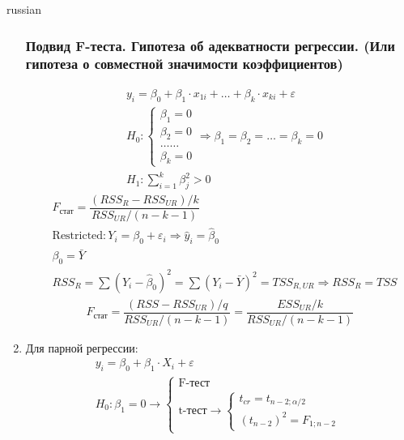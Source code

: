 \documentclass{article}
\begin{document}
\begin{otherlanguage*}{russian}
\begin{enumerate}
\subsubsection*{Подвид F-теста. Гипотеза об адекватности регрессии. (Или гипотеза о совместной значимости коэффициентов)  }
\begin{align*}
&y_i = \beta_0 + \beta_1 \cdot x_{1i} + \ldots + \beta_k \cdot x_{ki} + \varepsilon \\ 
&H_0 : \begin{cases}
\beta_1 = 0 \\
\beta_2 = 0 \\
\ldots \ldots \\ 
\beta_k = 0 
\end{cases} \Rightarrow \beta_1 = \beta_2 = \ldots = \beta_k = 0 \\
&H_1: \sum_{i=1}^k \beta_j^2 > 0 
\end{align*}
\begin{align*}
&F_{\text{стат}}  = \dfrac{(RSS_R - RSS_{UR}) / k}{RSS_{UR} / (n - k - 1) } \\
&\text{Restricted}: Y_i = \beta_0 + \varepsilon_i \Rightarrow \hat y_i = \hat \beta_0 \\
&\beta_0 = \bar{Y} \\
&RSS_{R} = \sum (Y_i - \hat \beta_0 ) ^ 2 = \sum (Y_i - \bar{Y} ) ^ 2 = TSS_{R, UR} \Rightarrow RSS_{R} = TSS  
\end{align*}
\begin{align*}
F_{\text{стат}} = \dfrac{(RSS - RSS_{UR}) / q }{RSS_{UR} / (n - k -1 ) } =  \dfrac{ESS_{UR}  / k }{RSS_{UR} / (n - k -1 ) } 
\end{align*}
\item Для парной регрессии: 
\begin{align*}
y_i = \beta_0 + \beta_1 \cdot X_i + \varepsilon \\ 
H_0: \beta_1 = 0 \rightarrow \begin{cases}
\text{F-тест} \\
\text{t-тест} \rightarrow \begin{cases} t_{cr} = t_{n-2; \alpha / 2} \\ (t_{n-2})^2 = F_{1; n-2} \end{cases}
\end{cases}
\end{align*}
\end{enumerate}
\end{otherlanguage*} 
\end{document}
